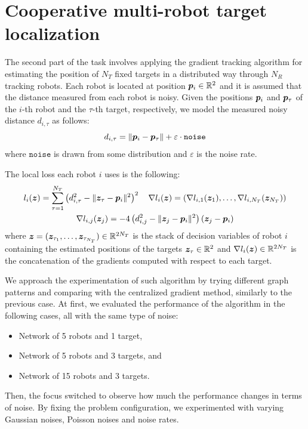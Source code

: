 \documentclass[a4paper,11pt,oneside]{book}
\begin{document}
\section{Cooperative multi-robot target localization}

The second part of the task involves applying the gradient tracking algorithm for estimating the position of $N_T$ fixed targets in a distributed way through $N_R$ tracking robots. Each robot is located at position ${\bm{p}}_i \in {\mathbb{R}}^2$ and it is assumed that the distance measured from each robot is noisy. Given the positions ${\bm{p}}_i$ and ${\bm{p}}_\tau$ of the $i$-th robot and the $\tau$-th target, respectively, we model the measured noisy distance $d_{i,\tau}$ as follows:
\[
      d_{i,\tau} = \Vert {\bm{p}}_i - {\bm{p}}_\tau \Vert + \varepsilon \cdot \texttt{noise}
\]
where $\texttt{noise}$ is drawn from some distribution and $\varepsilon$ is the noise rate.

The local loss each robot $i$ uses is the following:
\[
      \begin{gathered}
            l_i({\bm{z}}) = \sum_{\tau=1}^{N_T} \left( d_{i,\tau}^2 - \Vert {\bm{z}}_{\tau} - {\bm{p}}_i \Vert^2 \right)^2
            \quad
            \nabla l_{i}({\bm{z}}) = (\nabla l_{i,1}({\bm{z}}_{1}), \dots, \nabla l_{i,N_T}({\bm{z}}_{N_T}))
            \\
            \nabla l_{i,j}({\bm{z}}_{j}) = -4 \left( d_{i,j}^2 - \Vert {\bm{z}}_{j} - {\bm{p}}_i \Vert^2 \right) \left( {\bm{z}}_{j} - {\bm{p}}_i \right)
      \end{gathered}
\]
where ${\bm{z}} = ({\bm{z}}_{\tau_1}, \dots, {\bm{z}}_{\tau_{N_T}}) \in {\mathbb{R}}^{2N_T}$ is the stack of decision variables of robot $i$ containing the estimated positions of the targets ${\bm{z}}_{\tau} \in {\mathbb{R}}^2$ and $\nabla l_i({\bm{z}}) \in {\mathbb{R}}^{2N_T}$ is the concatenation of the gradients computed with respect to each target.

We approach the experimentation of such algorithm by trying different graph patterns and comparing with the centralized gradient method, similarly to the previous case. At first, we evaluated the performance of the algorithm in the following cases, all with the same type of noise:
\begin{itemize}
      \item Network of 5 robots and 1 target,
      \item Network of 5 robots and 3 targets, and
      \item Network of 15 robots and 3 targets.
\end{itemize}

Then, the focus switched to observe how much the performance changes in terms of noise. By fixing the problem configuration, we experimented with varying Gaussian noises, Poisson noises and noise rates.
\end{document}
